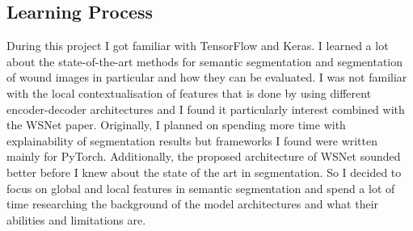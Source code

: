 \subsection{Learning Process}

During this project I got familiar with TensorFlow and Keras. I learned a lot about the state-of-the-art methods for semantic segmentation and segmentation of wound images in particular and how they can be evaluated. I was not familiar with the local contextualisation of features that is done by using different encoder-decoder architectures and I found it particularly interest combined with the WSNet paper. Originally, I planned on spending more time with explainability of segmentation results but frameworks I found were written mainly for PyTorch. Additionally, the proposed architecture of WSNet sounded better before I knew about the state of the art in segmentation. So I decided to focus on global and local features in semantic segmentation and spend a lot of time researching the background of the model architectures and what their abilities and limitations are.
